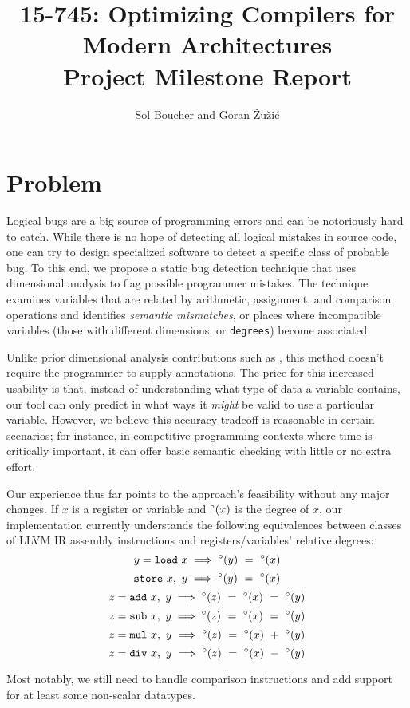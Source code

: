 \documentclass[12pt]{article}
\title{{\small 15-745: Optimizing Compilers for Modern Architectures} \\ Project Milestone Report}
\author{Sol Boucher and Goran \v{Z}u\v{z}i\'c}
\begin{document}
\maketitle

\section{Problem}

Logical bugs are a big source of programming errors and can be notoriously hard to catch.
While there is no hope of detecting all logical mistakes in source code, one can try to design specialized software to detect a specific class of probable bug.
To this end, we propose a static bug detection technique that uses dimensional analysis to flag possible programmer mistakes.
The technique examines variables that are related by arithmetic, assignment, and comparison operations and identifies \textit{semantic mismatches}, or places where incompatible variables (those with different dimensions, or \texttt{degrees}) become associated.

Unlike prior dimensional analysis contributions such as \cite{hilfinger1988ada}, this method doesn't require the programmer to supply annotations.
The price for this increased usability is that, instead of understanding what type of data a variable contains, our tool can only predict in what ways it \textit{might} be valid to use a particular variable.
However, we believe this accuracy tradeoff is reasonable in certain scenarios; for instance, in competitive programming contexts where time is critically important, it can offer basic semantic checking with little or no extra effort.

Our experience thus far points to the approach's feasibility without any major changes.
If $x$ is a register or variable and $\degree(x)$ is the degree of $x$, our implementation currently understands the following equivalences between classes of LLVM IR assembly instructions and registers/variables' relative degrees:
\[y = \mathtt{load}\ x \implies \degree(y)\ =\ \degree(x)\]
\[\mathtt{store}\ x,\ y \implies \degree(y)\ =\ \degree(x)\]
\[z = \mathtt{add}\ x,\ y \implies \degree(z)\ =\ \degree(x)\ =\ \degree(y)\]
\[z = \mathtt{sub}\ x,\ y \implies \degree(z)\ =\ \degree(x)\ =\ \degree(y)\]
\[z = \mathtt{mul}\ x,\ y \implies \degree(z)\ =\ \degree(x)\ +\ \degree(y)\]
\[z = \mathtt{div}\ x,\ y \implies \degree(z)\ =\ \degree(x)\ -\ \degree(y)\]

Most notably, we still need to handle comparison instructions and add support for at least some non-scalar datatypes.
\end{document}
